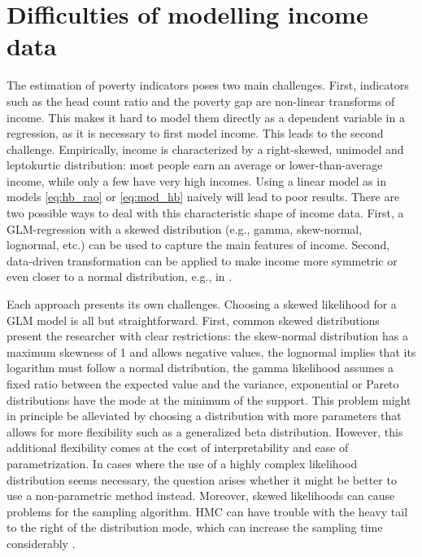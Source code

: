 \section{Difficulties of modelling income data}
\label{ch:difficulties}
The estimation of poverty indicators poses two main challenges.
First, indicators such as the head count ratio and the poverty gap are non-linear transforms of income.
This makes it hard to model them directly as a dependent variable in a regression, as it is necessary to first model income.
This leads to the second challenge.
Empirically, income is characterized by a right-skewed, unimodel and leptokurtic distribution:
most people earn an average or lower-than-average income, while only a few have very high incomes.
Using a linear model as in models \ref{eq:hb_rao} or \ref{eq:mod_hb} naively will lead to poor results.
There are two possible ways to deal with this characteristic shape of income data.
First, a GLM-regression with a skewed distribution (e.g., gamma, skew-normal, lognormal, etc.) can be used to capture the main features of income.
Second, data-driven transformation can be applied to make income more symmetric or even closer to a normal distribution, e.g., in \cite{rojas_perilla_data_2020}.

Each approach presents its own challenges.
Choosing a skewed likelihood for a GLM model is all but straightforward.
First, common skewed distributions present the researcher with clear restrictions:
the skew-normal distribution has a maximum skewness of 1 and allows negative values, the lognormal implies that its logarithm must follow a normal distribution, the gamma likelihood assumes a fixed ratio between the expected value and the variance, exponential or Pareto distributions have the mode at the minimum of the support.
This problem might in principle be alleviated by choosing a distribution with more parameters that allows for more flexibility such as a generalized beta distribution.
However, this additional flexibility comes at the cost of interpretability and ease of parametrization.
In cases where the use of a highly complex likelihood distribution seems necessary, the question arises whether it might be better to use a non-parametric method instead.
Moreover, skewed likelihoods can cause problems for the sampling algorithm. HMC can have trouble with the heavy tail to the right of the distribution mode, which can increase the sampling time considerably \cite{betancourt_conceptual_2017}.

